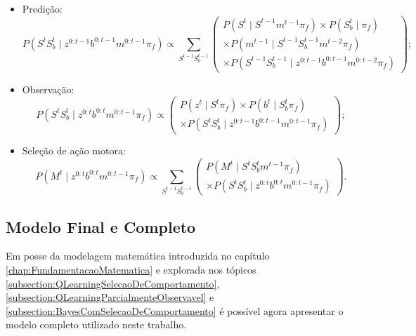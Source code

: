 \begin{itemize}
	\item Predição:
		\begin{equation}
    P \left( S^t S_b^t \mid z^{0: t-1} b^{0: t-1} m^{0: t-1} \pi_f \right) \propto \sum\limits_{S^{t-1} S_b^{t-1}}
        \left(
            \begin{array}{l}
                P \left( S^t \mid S^{t-1} m^{t-1} \pi_f \right) \times P \left( S_b^t \mid \pi_f \right) \\
                \times P \left( m^{t-1} \mid S^{t-1} S_b^{t-1} m^{t-2} \pi_f \right)\\
                \times P \left( S^{t-1} S_b^{t-1} \mid z^{0: t-1} b^{0: t-1} m^{0: t-2} \pi_f \right)
            \end{array}
        \right);
		\end{equation}
	\item Observação:
		\begin{equation}
    P \left( S^t S_b^t \mid z^{0: t} b^{0: t} m^{0: t-1} \pi_f \right) \propto
        \left(
            \begin{array}{l}
                P \left( z^t \mid S^t \pi_f \right) \times P \left( b^t \mid S_b^t \pi_f \right) \\
                \times P \left( S^t S_b^t \mid z^{0: t-1} b^{0: t-1} m^{0: t-1} \pi_f \right)
            \end{array}
        \right);
		\end{equation}
	\item Seleção de ação motora:
		\begin{equation}
    P \left( M^t \mid z^{0: t} b^{0: t} m^{0: t-1} \pi_f \right) \propto \sum\limits_{S^{t-1} S_b^{t-1}}
        \left(
            \begin{array}{l}
                P \left( M^t \mid S^t S_b^t m^{t-1} \pi_f \right)\\
                \times P \left( S^t S_b^t \mid z^{0: t} b^{0: t} m^{0: t-1} \pi_f \right)
            \end{array}
        \right).
		\end{equation}
\end{itemize}


\subsection{Modelo Final e Completo}

Em posse da modelagem matemática introduzida no capítulo \ref{chap:FundamentacaoMatematica} e explorada nos tópicos \ref{subsection:QLearningSelecaoDeComportamento}, \ref{subsection:QLearningParcialmenteObservavel} e \ref{subsection:BayesComSelecaoDeComportamento} é possível agora apresentar o modelo completo utilizado neste trabalho.

